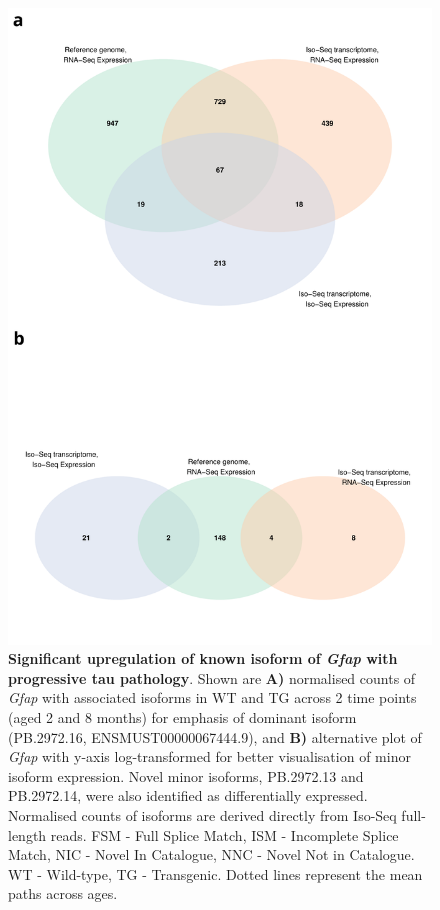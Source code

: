 \begin{figure}[!htp]
	\centering
	\includegraphics[page=4,scale = 0.55]{Figures/WholeDifferentialAnalysis.pdf}
	\captionsetup{width=0.95\textwidth}
	\caption[Differential Isoform Expression: Changes in transcript expression of isoforms associated with \textit{Gfap}]%
	{\textbf{Significant upregulation of known isoform of \textit{Gfap} with progressive tau pathology}. Shown are \textbf{A)} normalised counts of \textit{Gfap} with associated isoforms in WT and TG across 2 time points (aged 2 and 8 months) for emphasis of dominant isoform (PB.2972.16, ENSMUST00000067444.9), and \textbf{B)} alternative plot of \textit{Gfap} with y-axis log-transformed for better visualisation of minor isoform expression. Novel minor isoforms, PB.2972.13 and PB.2972.14, were also identified as differentially expressed. Normalised counts of isoforms are derived directly from Iso-Seq full-length reads. FSM - Full Splice Match, ISM - Incomplete Splice Match, NIC - Novel In Catalogue, NNC - Novel Not in Catalogue. WT - Wild-type, TG - Transgenic. Dotted lines represent the mean paths across ages.} 
	\label{fig:DEI_gfap}
\end{figure}

